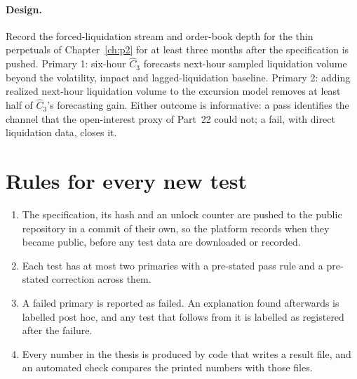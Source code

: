 \paragraph{Design.} Record the forced-liquidation stream and order-book depth for the thin perpetuals of Chapter~\ref{ch:p2} for at least three months after the specification is pushed. Primary 1: six-hour $\hat C_3$ forecasts next-hour sampled liquidation volume beyond the volatility, impact and lagged-liquidation baseline. Primary 2: adding realized next-hour liquidation volume to the excursion model removes at least half of $\hat C_3$'s forecasting gain. Either outcome is informative: a pass identifies the channel that the open-interest proxy of Part~22 could not; a fail, with direct liquidation data, closes it.


\section{Rules for every new test}\label{sec:ev_rules}

\begin{enumerate}
\item The specification, its hash and an unlock counter are pushed to the public repository in a commit of their own, so the platform records when they became public, before any test data are downloaded or recorded.
\item Each test has at most two primaries with a pre-stated pass rule and a pre-stated correction across them.
\item A failed primary is reported as failed. An explanation found afterwards is labelled post hoc, and any test that follows from it is labelled as registered after the failure.
\item Every number in the thesis is produced by code that writes a result file, and an automated check compares the printed numbers with those files.
\end{enumerate}
